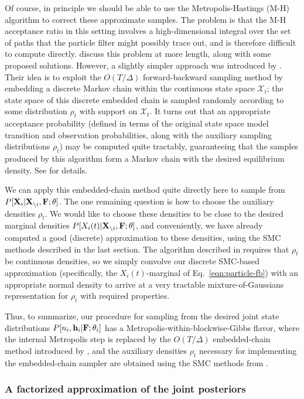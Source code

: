 Of course, in principle we should be able to use the Metropolis-Hastings (M-H) algorithm to correct these approximate samples. The problem is that the M-H acceptance ratio in this setting involves a high-dimensional integral over the set of paths that the particle filter might possibly trace out, and is therefore difficult to compute directly. \cite{Andrieu2007} discuss this problem at more length, along with some proposed solutions. However, a slightly simpler approach was introduced by \cite{NBR03}. Their idea is to exploit the $O(T/\Delta)$ forward-backward sampling method by embedding a discrete Markov chain within the continuous state space $\mathcal{X}_t$; the state space of this discrete embedded chain is sampled randomly according to some distribution $\rho_t$ with support on $\mathcal{X}_t$. It turns out that an appropriate acceptance probability (defined in terms of the original state space model transition and observation probabilities, along with the auxiliary sampling distributions $\rho_t$) may be computed quite tractably, guaranteeing that the samples produced by this algorithm form a Markov chain with the desired equilibrium density. See \cite{NBR03} for details.

We can apply this embedded-chain method quite directly here to sample from $P[{\bf X}_i | {\bf X}_{\backslash i}, {\bf F}; \mathbf{\theta}]$. The one remaining question is how to choose the auxiliary densities $\rho_t$. We would like to choose these densities to be close to the desired marginal densities $P[X_i(t) | {\bf X}_{\backslash i}, {\bf F}; \mathbf{\theta}]$, and conveniently, we have already computed a good (discrete) approximation to these densities, using the SMC methods described in the last section. The algorithm described in \cite{NBR03} requires that $\rho_t$ be continuous densities, so we simply convolve our discrete SMC-based approximation (specifically, the $X_i(t)$-marginal of Eq.~\eqref{eqn:particle-fb}) with an appropriate normal density to arrive at a very tractable mixture-of-Gaussians representation for $\rho_t$ with required properties.

Thus, to summarize, our procedure for sampling from the desired joint state distributions $P[n_i, \mathbf{h}_i | {\bf F};\mathbf{\theta}_i]$ has a Metropolis-within-blockwise-Gibbs flavor, where the internal Metropolis step is replaced by the $O(T/\Delta)$ embedded-chain method introduced by \cite{NBR03}, and the auxiliary densities $\rho_t$ necessary for implementing the embedded-chain sampler are obtained using the SMC methods from \cite{Vogelstein2009}.

\subsubsection{A factorized approximation of the joint posteriors}
\label{sec:cheaper-high-snr}

